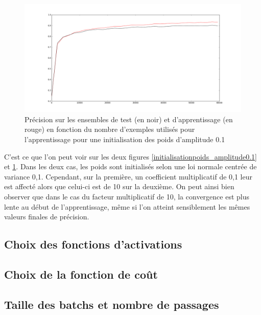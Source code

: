 \documentclass{report}
\begin{document}
\begin{figure}[!h]
\begin{center}
\includegraphics[scale=0.2]{images/initialisationpoids_amplitude10.png}
\caption{Précision sur les ensembles de test (en noir) et d'apprentissage (en rouge) en fonction du nombre d'exemples utilisés pour l'apprentissage pour une initialisation des poids d'amplitude 0.1}
\label{initialisationpoids_amplitude10}
\end{center}
\end{figure}

C'est ce que l'on peut voir sur les deux figures \ref{initialisationpoids_amplitude0.1} et \ref{initialisationpoids_amplitude10}. Dans les deux cas, les poids sont initialisés selon une loi normale centrée de variance 0,1. Cependant, sur la première, un coefficient multiplicatif de 0,1 leur est affecté alors que celui-ci est de 10 sur la deuxième.
On peut ainsi bien observer que dans le cas du facteur multiplicatif de 10, la convergence est plus lente au début de l'apprentissage, même si l'on atteint sensiblement les mêmes valeurs finales de précision.



\subsection{Choix des fonctions d'activations}


\subsection{Choix de la fonction de coût}


\subsection{Taille des batchs et nombre de passages}
\end{document}
